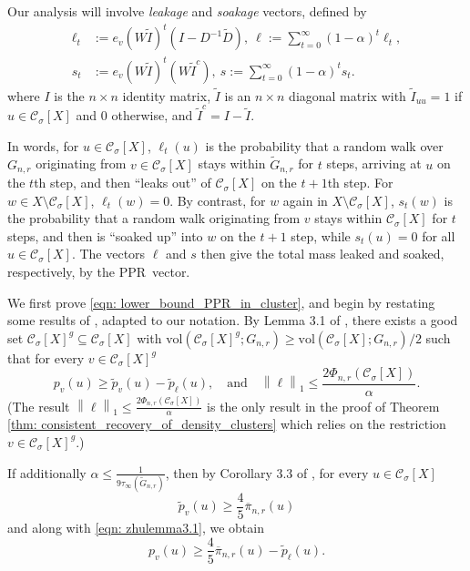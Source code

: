 \documentclass[11pt,twoside]{article}
\newcommand{\vol}{\mathrm{vol}}
\newcommand{\norm}[1]{\left\lVert#1\right\rVert}
\newcommand{\1}{\mathbbm{1}}
\newcommand{\pbf}{p}        %
\newcommand{\pibf}{\pi}
\newcommand{\Xbf}{X}
\newcommand{\Wbf}{W}
\newcommand{\Dbf}{D}
\newcommand{\Cset}{\mathcal{C}}
\newcommand{\Csig}{\Cset_{\sigma}}
\newcommand{\pprspace}{{\sc PPR~}}
\newcommand{\wDbf}{\widetilde{\Dbf}}
\begin{document}
	Our analysis will involve \emph{leakage} and \emph{soakage} vectors, defined by
	\begin{align}
	\label{eqn: leakage_soakage}
	\ell_t & := e_v (\Wbf \widetilde{I} )^t (I - \Dbf^{-1} \wDbf),~ \ell := \sum_{t = 0}^{\infty} (1 - \alpha)^t \ell_t, \nonumber \\
	s_t & := e_v (\Wbf \widetilde{I} )^t (\Wbf \widetilde{I}^c),~ s := \sum_{t = 0}^{\infty} (1 - \alpha)^{t} s_t.
	\end{align}
	where $I$ is the $n \times n$ identity matrix, $\widetilde{I}$ is an $n \times n$ diagonal matrix with $\widetilde{I}_{uu} = 1$ if $u \in \Csig[\Xbf]$ and $0$ otherwise, and $\widetilde{I}^c = I - \widetilde{I}$.
	
	In words, for $u \in \Csig[\Xbf]$, $\ell_t(u)$ is the probability that a random walk over $G_{n,r}$ originating from $v \in \Csig[\Xbf]$ stays within $\widetilde{G}_{n,r}$ for $t$ steps, arriving at $u$ on the $t$th step, and then ``leaks out'' of $\Csig[\Xbf]$ on the $t + 1$th step. For $w \in \Xbf \setminus \Csig[\Xbf]$, $\ell_t(w) = 0$. By contrast, for $w$ again in $\Xbf \setminus \Csig[\Xbf]$, $s_t(w)$ is the probability that a random walk originating from $v$ stays within $\Csig[\Xbf]$ for $t$ steps, and then is ``soaked up'' into $w$ on the $t + 1$ step, while $s_t(u) = 0$ for all $u \in \Csig[\Xbf]$. The vectors $\ell$ and $s$ then give the total mass leaked and soaked, respectively, by the \pprspace vector. 
	
	We first prove \eqref{eqn: lower_bound_PPR_in_cluster}, and begin by restating some results of \citep{zhu2013}, adapted to our notation. By Lemma 3.1 of \citep{zhu2013}, there exists a good set $\Csig[\Xbf]^g \subseteq \Csig[\Xbf]$ with $\vol(\Csig[\Xbf]^g; G_{n,r}) \geq \vol(\Csig[\Xbf]; G_{n,r})/2$ such that for every $v \in \Csig[\Xbf]^g$
	\begin{equation}
	\label{eqn: zhulemma3.1}
	\pbf_v(u) \geq \widetilde{\pbf}_v(u) - \widetilde{\pbf}_{\ell}(u), \quad \textrm{and} \quad \norm{\ell}_1 \leq \frac{2 \Phi_{n,r}(\Csig[\Xbf])}{\alpha}.
	\end{equation}
	(The result $\norm{\ell}_1 \leq \frac{2 \Phi_{n,r}(\Csig[\Xbf])}{\alpha}$ is the only result in the proof of Theorem \ref{thm: consistent_recovery_of_density_clusters} which relies on the restriction $v \in \Csig[\Xbf]^g$.)
	
	If additionally $\alpha \leq \frac{1}{9\tau_{\infty}(\widetilde{G}_{n,r})}$, then by Corollary 3.3 of \citep{zhu2013}, for every $u \in \Csig[\Xbf]$
	\begin{equation*}
	\widetilde{\pbf}_v(u) \geq \frac{4}{5} \overline{\pibf}_{n,r}(u)
	\end{equation*}
	and along with \eqref{eqn: zhulemma3.1}, we obtain
	\begin{equation*}
	\pbf_v(u) \geq \frac{4}{5} \overline{\pibf}_{n,r}(u) - \widetilde{\pbf}_{\ell}(u).
	\end{equation*}
	
\end{document}
